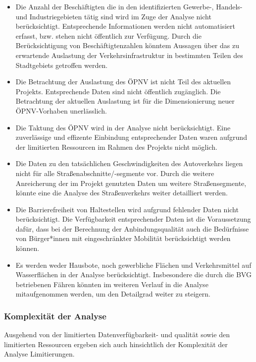 \begin{itemize}

    \item Die Anzahl der Beschäftigten die in den identifizierten Gewerbe-, Handels- und Industriegebieten tätig sind wird im Zuge der Analyse nicht berücksichtigt. Entsprechende Informationen werden nicht automatisiert erfasst, bzw. stehen nicht öffentlich zur Verfügung. Durch die Berücksichtigung von Beschäftigtenzahlen könntem Aussagen über das zu erwartende Auslastung der Verkehrsinfrastruktur in bestimmten Teilen des Stadtgebiets getroffen werden.

    \item Die Betrachtung der Auslastung des ÖPNV ist nicht Teil des aktuellen Projekts. Entsprechende Daten sind nicht öffentlich zugänglich. Die Betrachtung der aktuellen Auslastung ist für die Dimensionierung neuer ÖPNV-Vorhaben unerlässlich.

    \item Die Taktung des ÖPNV wird in der Analyse nicht berücksichtigt​. Eine zuverlässige und effizente Einbindung entsprechender Daten waren aufgrund der limitierten Ressourcen im Rahmen des Projekts nicht möglich.

    \item Die Daten zu den tatsächlichen Geschwindigkeiten des Autoverkehrs liegen nicht für alle Straßenabschnitte/-segmente vor​. Durch die weitere Anreicherung der im Projekt genutzten Daten um weitere Straßensegmente, könnte eine die Analyse des Straßenverkehrs weiter detailliert werden.

    \item Die Barrierefreiheit von Haltestellen wird aufgrund fehlender Daten nicht berücksichtigt​. Die Verfügbarkeit entsprechender Daten ist die Voraussetzung dafür, dass bei der Berechnung der Anbindungsqualität auch die Bedürfnisse von Bürger*innen mit eingeschränkter Mobilität berücksichtigt werden können.

    \item Es werden weder Hausbote, noch gewerbliche Flächen und Verkehrsmittel auf Wasserflächen in der Analyse berücksichtigt. Insbesondere die durch die BVG betriebenen Fähren könnten im weiteren Verlauf in die Analyse mitaufgenommen werden, um den Detailgrad weiter zu steigern.

\end{itemize}


\subsubsection{Komplexität der Analyse}
Ausgehend von der limitierten Datenverfügbarkeit- und qualität sowie den limitierten Ressourcen ergeben sich auch hinsichtlich der Komplexität der Analyse Limitierungen.

